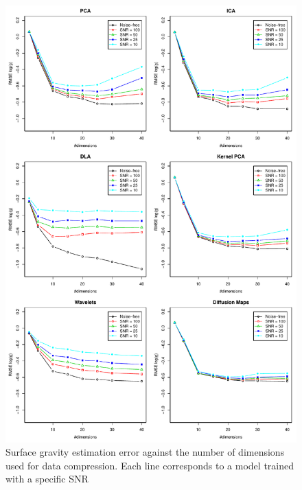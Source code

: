 \documentclass[a4paper,fleqn,usenatbib]{mnras}
\begin{document}
\begin{figure}
\centering\includegraphics[height=0.95\textheight]{flamesHR10_Logg_log_BestSVM_N-SNR-RMSE_test.pdf}
\caption{Surface gravity estimation error against the number of dimensions
  used for data compression. Each line corresponds to a model trained
  with a specific SNR}
\label{fig:methodsnrLogg}
\end{figure}
\end{document}
